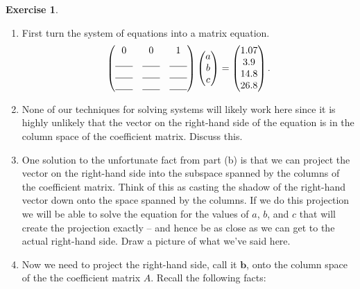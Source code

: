 \documentclass[
]{book}
\providecommand{\tightlist}{%
  \setlength{\itemsep}{0pt}\setlength{\parskip}{0pt}}
\theoremstyle{definition}
\theoremstyle{definition}
\theoremstyle{definition}
\newtheorem{exercise}{Exercise}[chapter]
\theoremstyle{remark}
\begin{document}
\begin{exercise}
\begin{enumerate}
\def\labelenumi{\alph{enumi}.}
\tightlist
\item
  First turn the system of equations into a matrix equation.
  \[ \begin{pmatrix} 0 & 0 & 1 \\ \underline{\hspace{0.25in}} & \underline{\hspace{0.25in}} & \underline{\hspace{0.25in}} \\ \underline{\hspace{0.25in}} & \underline{\hspace{0.25in}} & \underline{\hspace{0.25in}} \\ \underline{\hspace{0.25in}} & \underline{\hspace{0.25in}} & \underline{\hspace{0.25in}} \end{pmatrix} \begin{pmatrix} a \\ b \\ c \end{pmatrix} = \begin{pmatrix} 1.07 \\ 3.9 \\ 14.8 \\ 26.8 \end{pmatrix}. \]
\item
  None of our techniques for solving systems will likely work here since it is highly unlikely that the vector on the right-hand side of the equation is in the column space of the coefficient matrix. Discuss this.
\item
  One solution to the unfortunate fact from part (b) is that we can project the vector on the right-hand side into the subspace spanned by the columns of the coefficient matrix. Think of this as casting the shadow of the right-hand vector down onto the space spanned by the columns. If we do this projection we will be able to solve the equation for the values of \(a\), \(b\), and \(c\) that will create the projection exactly -- and hence be as close as we can get to the actual right-hand side. Draw a picture of what we've said here.
\item
  Now we need to project the right-hand side, call it \(\boldsymbol{b}\), onto the column space of the the coefficient matrix \(A\). Recall the following facts:


\end{enumerate}
\end{exercise}
\end{document}
